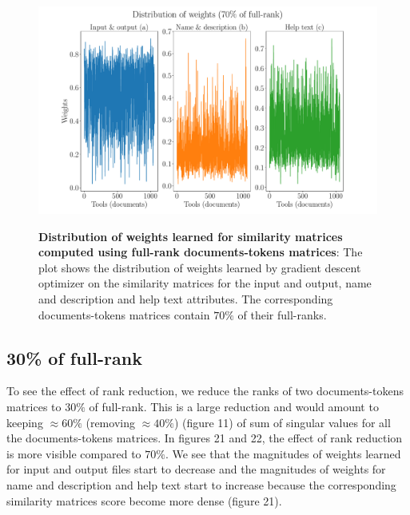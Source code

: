 \begin{figure}[h]
\begin{centering}
    {\includegraphics[scale=0.35]{figures/Weights_070.pdf}}
    \caption[Distribution of weights learned for similarity matrices computed using documents-tokens matrices reduced to $70\%$ of their full-rank]{\textbf{Distribution of weights learned for similarity matrices computed using full-rank documents-tokens matrices}: The plot shows the distribution of weights learned by gradient descent optimizer on the similarity matrices for the input and output, name and description and help text attributes. The corresponding documents-tokens matrices contain $70\%$ of their full-ranks.}
\end{centering}
\end{figure}

\subsection{30\% of full-rank}
To see the effect of rank reduction, we reduce the ranks of two documents-tokens matrices to $30\%$ of full-rank. This is a large reduction and would amount to keeping $\approx 60\%$ (removing $\approx 40\%$) (figure 11) of sum of singular values for all the documents-tokens matrices. In figures 21 and 22, the effect of rank reduction is more visible compared to $70\%$. We see that the magnitudes of weights learned for input and output files start to decrease and the magnitudes of weights for name and description and help text start to increase because the corresponding similarity matrices score become more dense (figure 21). 

